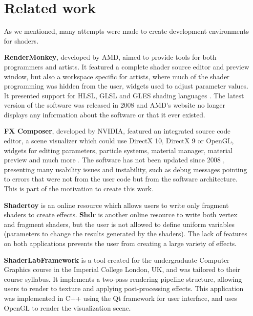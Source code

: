 \section{Related work}
As we mentioned, many attempts were made to create development environments for shaders.

\textbf{RenderMonkey}, developed by AMD, aimed to provide tools for both programmers and artists. It featured a complete shader source editor and preview window, but also a workspace specific for artists, where much of the shader programming was hidden from the user, widgets used to adjust parameter values. It presented support for HLSL, GLSL and GLES shading languages \cite{rendermonkey}. The latest version of the software was released in 2008 \cite{rendermonkey_release_notes} and AMD's website no longer displays any information about the software or that it ever existed.

\textbf{FX Composer}, developed by NVIDIA, featured an integrated source code editor, a scene visualizer which could use DirectX 10, DirectX 9 or OpenGL, widgets for editing parameters, particle systems, material manager, material preview and much more \cite{fxcomposer}. The software has not been updated since 2008 \cite{fxcomposer_release_notes}, presenting many usability issues and instability, such as debug messages pointing to errors that were not from the user code but from the software architecture. This is part of the motivation to create this work.

\textbf{Shadertoy} is an online resource which allows users to write only fragment shaders to create effects. \textbf{Shdr} is another online resource to write both vertex and fragment shaders, but the user is not allowed to define uniform variables (parameters to change the results generated by the shaders). The lack of features on both applications prevents the user from creating a large variety of effects.

\textbf{ShaderLabFramework} \cite{toisoul} is a tool created for the undergraduate Computer Graphics course in the Imperial College London, UK, and was tailored to their course syllabus. It implements a two-pass rendering pipeline structure, allowing users to render to texture and applying post-processing effects. This application was implemented in C++ using the Qt framework for user interface, and uses OpenGL to render the visualization scene.
